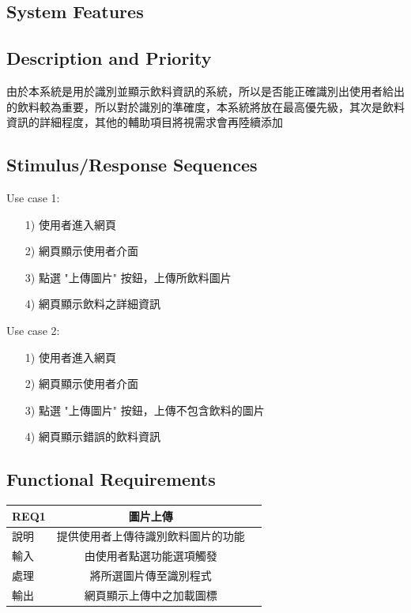 \documentclass{scrreprt}
\begin{document}
\begin{CJK}{UTF8}{bkai}
\chapter{System Features}

\section{Description and Priority}
由於本系統是用於識別並顯示飲料資訊的系統，所以是否能正確識別出使用者給出的飲料較為重要，所以對於識別的準確度，本系統將放在最高優先級，其次是飲料資訊的詳細程度，其他的輔助項目將視需求會再陸續添加

\section{Stimulus/Response Sequences}
Use case 1: 
\begin{itemize}
\item [1)]  使用者進入網頁
\item [2)]  網頁顯示使用者介面
\item [3)]  點選 "上傳圖片" 按鈕，上傳所飲料圖片
\item [4)]	網頁顯示飲料之詳細資訊
\end{itemize}

Use case 2: 
\begin{itemize}
\item [1)]  使用者進入網頁
\item [2)]  網頁顯示使用者介面
\item [3)]  點選 "上傳圖片" 按鈕，上傳不包含飲料的圖片
\item [4)]	網頁顯示錯誤的飲料資訊
\end{itemize}

\section{Functional Requirements}
\begin{center}
\begin{tabular}{|l|c|r|}\hline
REQ1 & 圖片上傳\\ \hline
說明 & 提供使用者上傳待識別飲料圖片的功能\\ \hline
輸入 & 由使用者點選功能選項觸發\\ \hline
處理 & 將所選圖片傳至識別程式\\ \hline
輸出 & 網頁顯示上傳中之加載圖標\\ \hline
\end{tabular}
\end{center}


\end{CJK}
\end{document}
